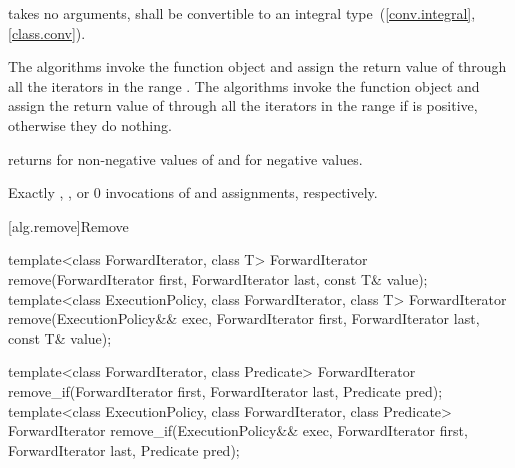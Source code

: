 \begin{itemdescr}
\pnum
\requires
{} takes no arguments,
shall be convertible to an integral type~(\ref{conv.integral}, \ref{class.conv}).

\pnum
\effects
The  algorithms invoke the function object  and assign the return
value of  through all the iterators in the range
. The  algorithms invoke the function object
 and assign the return value of  through all the iterators in
the range  if  is positive,
otherwise they do nothing.

\pnum
\returns {} returns  for non-negative values of 
and  for negative values.

\pnum
\complexity
Exactly
,
, or 0
invocations of  and assignments, respectively.
\end{itemdescr}

[alg.remove]{Remove}

%
%
\begin{itemdecl}
template<class ForwardIterator, class T>
  ForwardIterator remove(ForwardIterator first, ForwardIterator last,
                         const T& value);
template<class ExecutionPolicy, class ForwardIterator, class T>
  ForwardIterator remove(ExecutionPolicy&& exec,
                         ForwardIterator first, ForwardIterator last,
                         const T& value);

template<class ForwardIterator, class Predicate>
  ForwardIterator remove_if(ForwardIterator first, ForwardIterator last,
                            Predicate pred);
template<class ExecutionPolicy, class ForwardIterator, class Predicate>
  ForwardIterator remove_if(ExecutionPolicy&& exec,
                            ForwardIterator first, ForwardIterator last,
                            Predicate pred);
\end{itemdecl}

